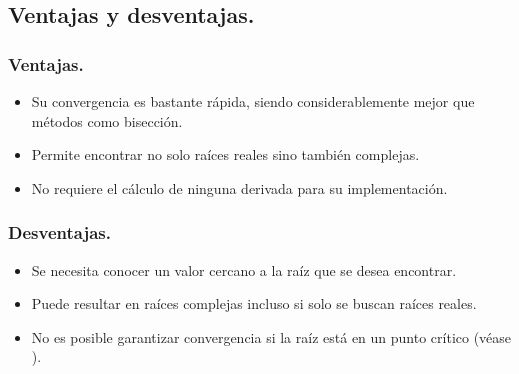 \subsection{Ventajas y desventajas.}
\subsubsection{Ventajas.}
\begin{itemize}
    \item Su convergencia es bastante rápida, siendo considerablemente mejor que métodos como bisección.
    \item Permite encontrar no solo raíces reales sino también complejas.
    \item No requiere el cálculo de ninguna derivada para su implementación.
\end{itemize}
\subsubsection{Desventajas.}
\begin{itemize}
    \item Se necesita conocer un valor cercano a la raíz que se desea encontrar.
    \item Puede resultar en raíces complejas incluso si solo se buscan raíces reales.
    \item No es posible garantizar convergencia si la raíz está en un punto crítico (véase ).
\end{itemize}